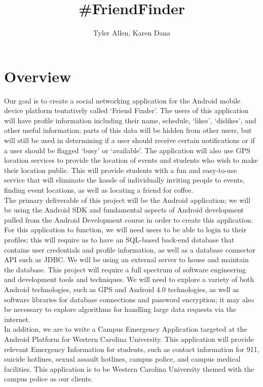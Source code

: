 \documentclass[11pt]{article}
\begin{document}
\title{\#FriendFinder}
\author{Tyler Allen, Karen Dana}
\maketitle

\section{Overview}

Our goal is to create a social networking application for the Android mobile 
device platform tentatively called `Friend Finder'. 
 The users of this application will have profile information including their 
name, schedule, `likes', `dislikes', and other useful information; parts of 
this data will be hidden from other users, but will still be used in determining if a 
user should receive certain notifications or if a user should be flagged 
`busy' or `available'.
The application will also use GPS location services to provide the 
location of events and students who wish to make their location public. This 
will provide students with a fun and easy-to-use service that will eliminate 
the hassle of individually inviting people to events, finding event locations, 
as well as locating a friend for coffee.\\

The primary deliverable of this project will be the Android application; we 
will be using the Android SDK and fundamental aspects of Android development 
pulled from the Android Development course in order to create this application. 
For this application to function, we will need users to be able to login to 
their profiles; this will require us to have an SQL-based back-end database 
that contains user credentials and profile information, as well as a database 
connector API such as JDBC. We will be using an external server to house and 
maintain the database.  This project will require a full spectrum of 
software engineering and development tools and techniques. We will need to 
explore a variety of both Android technologies, such as GPS and Android 4.0 
technologies, as well as software libraries for database connections and 
password encryption; it may also be necessary to explore algorithms for 
handling large data requests via the internet.\\

	In addition, we are to write a Campus Emergency Application targeted at the
    Android Platform for Western Carolina University. This application will 
    provide relevant Emergency Information for students, such as contact 
    information for 911, suicide hotlines, sexual assault hotlines, 
    campus police, and campus medical facilities. This application is to be
    Western Carolina University themed with the campus police as our 
    clients.
\end{document}
